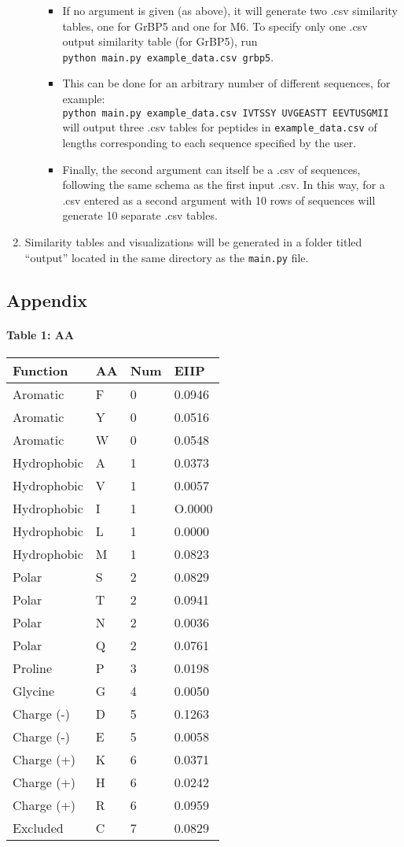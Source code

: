 \documentclass[]{article}
\let\oldparagraph\paragraph
\renewcommand{\paragraph}[1]{\oldparagraph{#1}\mbox{}}
\begin{document}
\begin{enumerate}
\begin{itemize}
    \begin{itemize}
    \item
      If no argument is given (as above), it will generate two .csv
      similarity tables, one for GrBP5 and one for M6. To specify only
      one .csv output similarity table (for GrBP5), run
      \texttt{python\ main.py\ example\_data.csv\ grbp5}.
    \item
      This can be done for an arbitrary number of different sequences,
      for example:
      \texttt{python\ main.py\ example\_data.csv\ IVTSSY\ UVGEASTT\ EEVTUSGMII}
      will output three .csv tables for peptides in
      \texttt{example\_data.csv} of lengths corresponding to each
      sequence specified by the user.
    \item
      Finally, the second argument can itself be a .csv of sequences,
      following the same schema as the first input .csv. In this way,
      for a .csv entered as a second argument with 10 rows of sequences
      will generate 10 separate .csv tables.
    \end{itemize}
  \end{itemize}
\item
  Similarity tables and visualizations will be generated in a folder
  titled ``output'' located in the same directory as the
  \texttt{main.py} file.
\end{enumerate}

\hypertarget{appendix}{%
\subsection{Appendix}\label{appendix}}

\hypertarget{table-1-aa}{%
\paragraph{Table 1: AA}\label{table-1-aa}}

\begin{longtable}[]{@{}llll@{}}
\toprule
Function & AA & Num & EIIP\tabularnewline
\midrule
\endhead
Aromatic & F & 0 & 0.0946\tabularnewline
Aromatic & Y & 0 & 0.0516\tabularnewline
Aromatic & W & 0 & 0.0548\tabularnewline
Hydrophobic & A & 1 & 0.0373\tabularnewline
Hydrophobic & V & 1 & 0.0057\tabularnewline
Hydrophobic & I & 1 & O.0000\tabularnewline
Hydrophobic & L & 1 & 0.0000\tabularnewline
Hydrophobic & M & 1 & 0.0823\tabularnewline
Polar & S & 2 & 0.0829\tabularnewline
Polar & T & 2 & 0.0941\tabularnewline
Polar & N & 2 & 0.0036\tabularnewline
Polar & Q & 2 & 0.0761\tabularnewline
Proline & P & 3 & 0.0198\tabularnewline
Glycine & G & 4 & 0.0050\tabularnewline
Charge (-) & D & 5 & 0.1263\tabularnewline
Charge (-) & E & 5 & 0.0058\tabularnewline
Charge (+) & K & 6 & 0.0371\tabularnewline
Charge (+) & H & 6 & 0.0242\tabularnewline
Charge (+) & R & 6 & 0.0959\tabularnewline
Excluded & C & 7 & 0.0829\tabularnewline
\bottomrule
\end{longtable}
\end{document}
